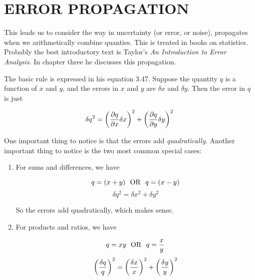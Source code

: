 \section{ERROR PROPAGATION}

	This leads us to consider the way in uncertainty (or error,
or noise), propagates when we arithmetically combine quanties. This is
treated in books on statistics. Probably the best introductory text is
Taylor's {\it An Introduction to Error Analysis}. In chapter three he
discusses this propagation. 

	The basic rule is expressed in his equation 3.47. Suppose the
quantity $q$ is a function of $x$ and $y$, and the errors in $x$ and $y$
are $\delta x$ and $\delta y$. Then the error in $q$ is just

\begin{equation}
\delta q^2 = \left( {\partial q \over \partial x} \delta x \right)^2
 + \left( {\partial q \over \partial y} \delta y \right)^2
\end{equation}

\noindent One important thing to notice is that the errors add {\it
quadratically}. Another important thing to notice is the two most common
special cases: \begin{enumerate}

	\item For sums and differences, we have

\begin{mathletters}
\begin{equation} 
q = (x + y) \ \ {\rm OR} \ \ q = (x - y)
\end{equation}
\begin{equation} \label{sumprop}
\delta q^2 = \delta x^2 + \delta y^2
\end{equation}
\end{mathletters}

\noindent So the errors add quadratically, which makes sense. 

	\item For products and ratios, we have
 
\begin{mathletters}
\begin{equation} \label{productprop}
q = xy \ \ {\rm OR} \ \ q = {x \over y}
\end{equation}
\begin{equation} \label{errorproduct}
\left({\delta q \over q}\right)^2= \left( \delta x \over x \right)^2 + \left( \delta y \over y \right)^2 
\end{equation}
\end{mathletters}

\end{enumerate}

